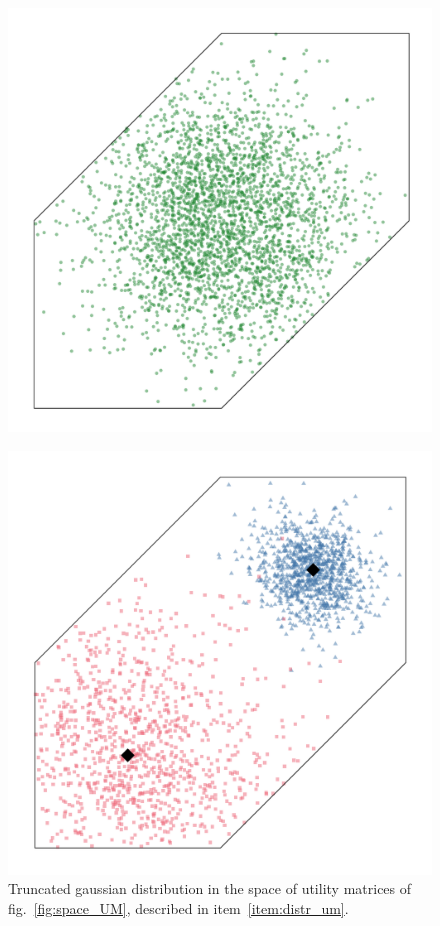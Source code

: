 \documentclass[\ifafour a4paper,12pt,\else a5paper,10pt,\fi%
onecolumn,oneside,article,%
british%
]{memoir}
\theoremstyle{remark}
\theoremstyle{innote}
\renewcommand*{\|}[1][]{\nonscript\:#1\vert\nonscript\:\mathopen{}}
\newcommand*{\fig}{fig.}%
\begin{document}
\begin{figure}[t]
  \centering
  \parbox[t]{0.45\linewidth}{%
    \centering\includegraphics[width=\linewidth]{distr_true_um_norm.pdf}\\
    \caption{Truncated gaussian distribution in the space of utility matrices of \fig~\ref{fig:space_UM}, described in item~\ref{item:distr_um}.}
    \label{fig:gauss_distr_um}}
  \parbox[t]{0.45\linewidth}{%
    \centering\includegraphics[width=\linewidth]{error_around_um2.pdf}
}
\end{figure}
\end{document}
